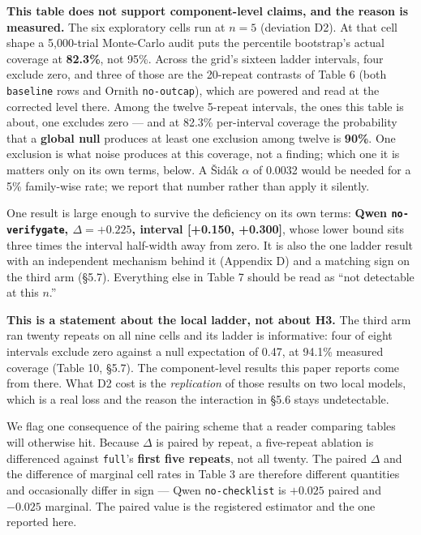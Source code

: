 \documentclass[
  10pt,
  a4paper,
]{article}
\let\oldtexttt\texttt
\renewcommand{\texttt}[1]{{\small\oldtexttt{#1}}}
\begin{document}
\textbf{This table does not support component-level claims, and the
reason is measured.} The six exploratory cells run at \(n=5\) (deviation
D2). At that cell shape a 5,000-trial Monte-Carlo audit puts the
percentile bootstrap's actual coverage at \textbf{82.3\%}, not 95\%.
Across the grid's sixteen ladder intervals, four exclude zero, and three
of those are the 20-repeat contrasts of Table 6 (both \texttt{baseline}
rows and Ornith \texttt{no-outcap}), which are powered and read at the
corrected level there. Among the twelve 5-repeat intervals, the ones
this table is about, one excludes zero --- and at 82.3\% per-interval
coverage the probability that a \textbf{global null} produces at least
one exclusion among twelve is \textbf{90\%}. One exclusion is what noise
produces at this coverage, not a finding; which one it is matters only
on its own terms, below. A Šidák \(\alpha\) of 0.0032 would be needed
for a 5\% family-wise rate; we report that number rather than apply it
silently.

One result is large enough to survive the deficiency on its own terms:
\textbf{Qwen \texttt{no-verifygate}, \(\Delta = +0.225\), interval
{[}+0.150, +0.300{]}}, whose lower bound sits three times the interval
half-width away from zero. It is also the one ladder result with an
independent mechanism behind it (Appendix D) and a matching sign on the
third arm (§5.7). Everything else in Table 7 should be read as ``not
detectable at this \(n\).''

\textbf{This is a statement about the local ladder, not about H3.} The
third arm ran twenty repeats on all nine cells and its ladder is
informative: four of eight intervals exclude zero against a null
expectation of 0.47, at 94.1\% measured coverage (Table 10, §5.7). The
component-level results this paper reports come from there. What D2 cost
is the \emph{replication} of those results on two local models, which is
a real loss and the reason the interaction in §5.6 stays undetectable.

We flag one consequence of the pairing scheme that a reader comparing
tables will otherwise hit. Because \(\Delta\) is paired by repeat, a
five-repeat ablation is differenced against \texttt{full}'s
\textbf{first five repeats}, not all twenty. The paired \(\Delta\) and
the difference of marginal cell rates in Table 3 are therefore different
quantities and occasionally differ in sign --- Qwen
\texttt{no-checklist} is \(+0.025\) paired and \(-0.025\) marginal. The
paired value is the registered estimator and the one reported here.
\end{document}
